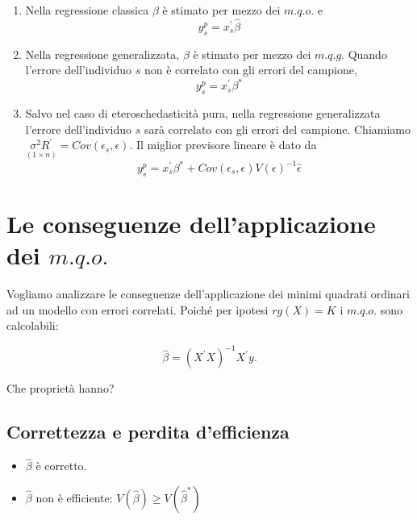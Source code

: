 \documentclass[a4paper]{report}
\theoremstyle{remark}
\begin{document}
\begin{enumerate}
\item Nella regressione classica $\beta $ \`{e} stimato per mezzo dei $%
m.q.o. $ e%
\begin{equation*}
y_{s}^{p}=x_{s}^{\prime }\hat{\beta}
\end{equation*}

\item Nella regressione generalizzata, $\beta $ \`{e} stimato per mezzo dei $%
m.q.g.$ Quando l'errore dell'individuo $s$ non \`{e} correlato con gli
errori del campione,%
\begin{equation*}
y_{s}^{p}=x_{s}^{\prime }\beta ^{\ast }
\end{equation*}

\item Salvo nel caso di eteroschedasticit\`{a} pura, nella regressione
generalizzata l'errore dell'individuo $s$ sar\`{a} correlato con gli errori
del campione. Chiamiamo $\underset{(1\times n)}{\sigma ^{2}R^{\prime }}%
=Cov(\epsilon _{s},\epsilon )$. Il miglior previsore lineare \`{e} dato da%
\begin{equation*}
y_{s}^{p}=x_{s}^{\prime }\beta ^{\ast }+Cov(\epsilon _{s},\epsilon
)V(\epsilon )^{-1}\hat{\epsilon}
\end{equation*}
\end{enumerate}

\section{Le conseguenze dell'applicazione dei $m.q.o.$}

Vogliamo analizzare le conseguenze dell'applicazione dei minimi quadrati
ordinari ad un modello con errori correlati. Poich\'{e} per ipotesi $rg(X)=K$
i $m.q.o.$ sono calcolabili:

\begin{equation*}
\hat{\beta}=(X^{\prime }X)^{-1}X^{\prime }y.
\end{equation*}

Che propriet\`{a} hanno?

\subsection{Correttezza e perdita d'efficienza}

\begin{itemize}
\item $\hat{\beta}$ \`{e} corretto.

\item $\hat{\beta}$ non \`{e} efficiente: $V(\hat{\beta})\geq V(\hat{\beta}%
^{\ast })$
\end{itemize}
\end{document}
